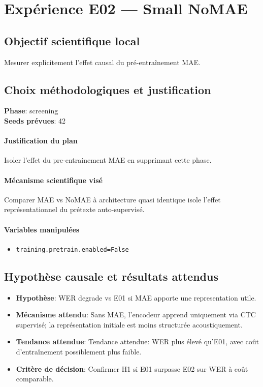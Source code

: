 \documentclass[11pt,a4paper]{article}
\begin{document}
\section{Expérience E02 --- Small NoMAE}
\subsection{Objectif scientifique local}
Mesurer explicitement l'effet causal du pré-entraînement MAE.

\subsection{Choix méthodologiques et justification}
\textbf{Phase}: screening\\
\textbf{Seeds prévues}: 42\\


\paragraph{Justification du plan}
Isoler l'effet du pre-entrainement MAE en supprimant cette phase.

\paragraph{Mécanisme scientifique visé}
Comparer MAE vs NoMAE à architecture quasi identique isole l'effet représentationnel du prétexte auto-supervisé.

\paragraph{Variables manipulées}
\begin{itemize}
\item \texttt{training.pretrain.enabled=False}
\end{itemize}

\subsection{Hypothèse causale et résultats attendus}
\begin{itemize}[leftmargin=1.2cm]
\item \textbf{Hypothèse}: WER degrade vs E01 si MAE apporte une representation utile.
\item \textbf{Mécanisme attendu}: Sans MAE, l'encodeur apprend uniquement via CTC supervisé; la représentation initiale est moins structurée acoustiquement.
\item \textbf{Tendance attendue}: Tendance attendue: WER plus élevé qu'E01, avec coût d'entraînement possiblement plus faible.
\item \textbf{Critère de décision}: Confirmer H1 si E01 surpasse E02 sur WER à coût comparable.
\end{itemize}
\end{document}
